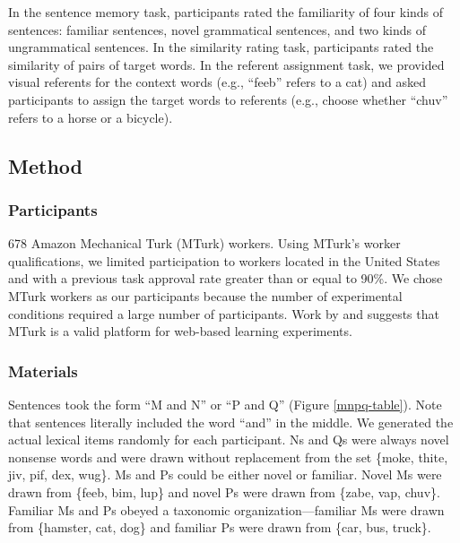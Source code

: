 \documentclass[man,floatsintext]{apa6}
\begin{document}
In the sentence memory task, participants rated the familiarity of four kinds of sentences: familiar sentences, novel grammatical sentences, and two kinds of ungrammatical sentences. In the similarity rating task, participants rated the similarity of pairs of target words. In the referent assignment task, we provided visual referents for the context words (e.g., ``feeb'' refers to a cat) and asked participants to assign the target words to referents (e.g., choose whether ``chuv'' refers to a horse or a bicycle).

\subsection{Method}

\subsubsection{Participants}
678 Amazon Mechanical Turk (MTurk) workers. Using MTurk's worker qualifications, we limited participation to workers located in the United States and with a previous task approval rate greater than or equal to 90\%. We chose MTurk workers as our participants because the number of experimental conditions required a large number of participants. Work by \citet{buhrmester2010} and \citet{crump2013} suggests that MTurk is a valid platform for web-based learning experiments.

\subsubsection{Materials}
Sentences took the form ``M and N'' or ``P and Q'' (Figure \ref{mnpq-table}). Note that sentences literally included the word ``and'' in the middle. We generated the actual lexical items randomly for each participant. Ns and Qs were always novel nonsense words and were drawn without replacement from the set \{moke, thite, jiv, pif, dex, wug\}. Ms and Ps could be either novel or familiar. Novel Ms were drawn from \{feeb, bim, lup\} and novel Ps were drawn from \{zabe, vap, chuv\}. Familiar Ms and Ps obeyed a taxonomic organization---familiar Ms were drawn from \{hamster, cat, dog\} and familiar Ps were drawn from \{car, bus, truck\}.
\end{document}
